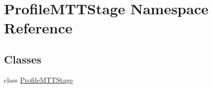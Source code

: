 \hypertarget{namespaceProfileMTTStage}{\section{Profile\-M\-T\-T\-Stage Namespace Reference}
\label{namespaceProfileMTTStage}
}
\subsection*{Classes}
\begin{DoxyCompactItemize}
\item 
class \hyperlink{classProfileMTTStage_1_1ProfileMTTStage}{Profile\-M\-T\-T\-Stage}
\end{DoxyCompactItemize}
